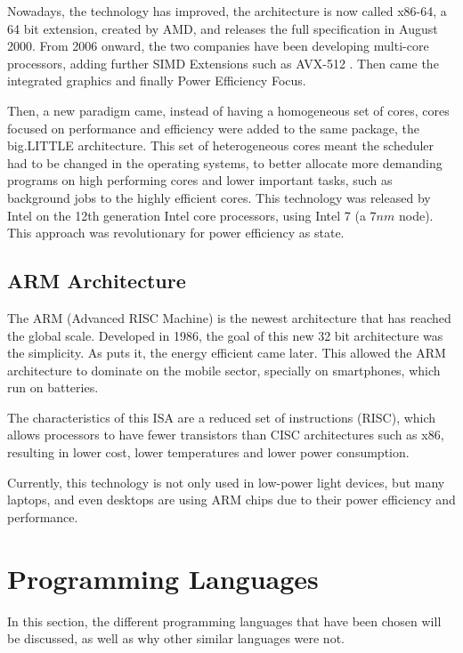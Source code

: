 Nowadays, the technology has improved, the architecture is now called x86-64, a 64 bit extension, created by AMD, and releases the full specification in August 2000. From 2006 onward, the two companies have been developing multi-core processors, adding further \gls{SIMD} Extensions such as AVX-512 \cite{intel-avx512}. Then came the integrated graphics and finally Power Efficiency Focus. 

Then, a new paradigm came, instead of having a homogeneous set of cores, cores focused on performance and efficiency were added to the same package, the big.LITTLE architecture. This set of heterogeneous cores meant the scheduler had to be changed in the operating systems, to better allocate more demanding programs on high performing cores and lower important tasks, such as background jobs to the highly efficient cores. This technology was released by Intel on the 12th generation Intel core processors, using Intel 7 (a $7 nm$ node). This approach was revolutionary for power efficiency as \textcite{big-little} state.


\subsection{ARM Architecture}
The ARM (Advanced RISC Machine) is the newest architecture that has reached the global scale. Developed in 1986, the goal of this new 32 bit architecture was the simplicity. As \textcite{arm-story} puts it, the energy efficient came later. This allowed the ARM architecture to dominate on the mobile sector, specially on smartphones, which run on batteries.

The characteristics of this ISA are a reduced set of instructions (RISC), which  allows processors to have fewer transistors than CISC architectures such as x86, resulting in lower cost, lower temperatures and lower power consumption.

Currently, this technology is not only used in low-power light devices, but many laptops, and even desktops are using ARM chips due to their power efficiency and performance.



\section{Programming Languages}

In this section, the different programming languages that have been chosen will be discussed, as well as why other similar languages were not.

